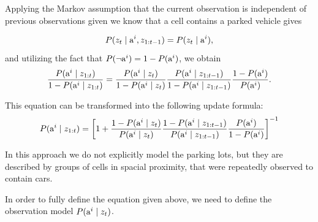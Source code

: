 Applying the Markov assumption that the current observation is independent of
previous observations given we know that a cell contains a parked vehicle
gives

\begin{equation}
P(z_{t} \mid {\mbox{a}^i}, z_{1:t-1}) = P(z_{t} \mid {\mbox{a}^i}),
\end{equation}
\noindent
and utilizing the fact that $P(\neg {\mbox{a}^i}) = 1 - P({\mbox{a}^i})$, we obtain
\begin{eqnarray}
\frac{ P({\mbox{a}^i} \mid z_{1:t}) }{ 1 - P({\mbox{a}^i} \mid z_{1:t})} = \frac{ P( {\mbox{a}^i} \mid z_{t})}{ 1 - P({\mbox{a}^i} \mid z_{t})}   \frac{ P({\mbox{a}^i} \mid z_{1:t-1})}{ 1 - P({\mbox{a}^i} \mid  z_{1:t-1})}   \frac{ 1 - P({\mbox{a}^i})}{ P({\mbox{a}^i})}.
\end{eqnarray}

\noindent This equation can be transformed into the following update formula:
\begin{eqnarray}
\label{eq:rec_update}
P({\mbox{a}^i}\mid z_{1:t})= \left[ 1 + \frac{1 -
P({\mbox{a}^i}\mid z_{t})}{P({\mbox{a}^i} \mid z_{t})} \frac{1 - P({\mbox{a}^i} \mid z_{1:t-1})}{P({\mbox{a}^i} \mid z_{1:t-1})}
\frac{P({\mbox{a}^i})}{1 - P({\mbox{a}^i})}  \right]^{-1}
\end{eqnarray}

In this approach we do not explicitly model the parking lots, but they are
described by groups of cells in spacial proximity, that were repeatedly
observed to contain cars.

In order to fully define the equation given above, we need to define the
observation model $P({\mbox{a}^i} \mid z_t)$.


